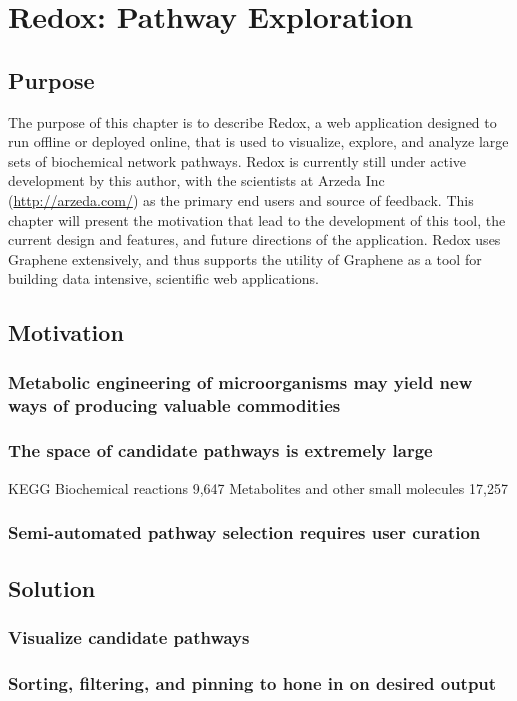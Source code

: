 \chapter{Redox: Pathway Exploration}
\label{chap:redox}

\section{Purpose}
The purpose of this chapter is to describe Redox, a web application designed to run offline or deployed online, that is used to visualize, explore, and analyze large sets of biochemical network pathways.
Redox is currently still under active development by this author, with the scientists at Arzeda Inc (\url{http://arzeda.com/}) as the primary end users and source of feedback.
This chapter will present the motivation that lead to the development of this tool, the current design and features, and future directions of the application.
Redox uses Graphene extensively, and thus supports the utility of Graphene as a tool for building data intensive, scientific web applications.

\section{Motivation}
\subsection{Metabolic engineering of microorganisms may yield new ways of producing valuable commodities}
\subsection{The space of candidate pathways is extremely large}
KEGG
Biochemical reactions 9,647
Metabolites and other small molecules 17,257
\subsection{Semi-automated pathway selection requires user curation}


\section{Solution}
\subsection{Visualize candidate pathways}
\subsection{Sorting, filtering, and pinning to hone in on desired output}
